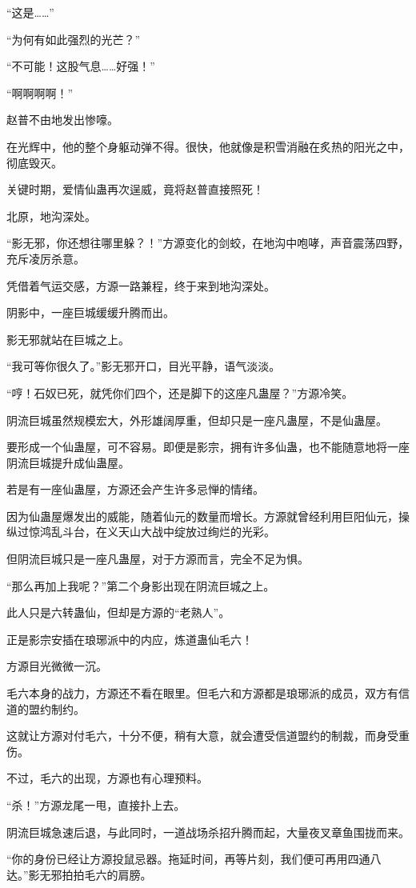\begin{this_body}
“这是……”

“为何有如此强烈的光芒？”

“不可能！这股气息……好强！”

“啊啊啊啊！”

赵普不由地发出惨嚎。

在光辉中，他的整个身躯动弹不得。很快，他就像是积雪消融在炙热的阳光之中，彻底毁灭。

关键时期，爱情仙蛊再次逞威，竟将赵普直接照死！

北原，地沟深处。

“影无邪，你还想往哪里躲？！”方源变化的剑蛟，在地沟中咆哮，声音震荡四野，充斥凌厉杀意。

凭借着气运交感，方源一路兼程，终于来到地沟深处。

阴影中，一座巨城缓缓升腾而出。

影无邪就站在巨城之上。

“我可等你很久了。”影无邪开口，目光平静，语气淡淡。

“哼！石奴已死，就凭你们四个，还是脚下的这座凡蛊屋？”方源冷笑。

阴流巨城虽然规模宏大，外形雄阔厚重，但却只是一座凡蛊屋，不是仙蛊屋。

要形成一个仙蛊屋，可不容易。即便是影宗，拥有许多仙蛊，也不能随意地将一座阴流巨城提升成仙蛊屋。

若是有一座仙蛊屋，方源还会产生许多忌惮的情绪。

因为仙蛊屋爆发出的威能，随着仙元的数量而增长。方源就曾经利用巨阳仙元，操纵过惊鸿乱斗台，在义天山大战中绽放过绚烂的光彩。

但阴流巨城只是一座凡蛊屋，对于方源而言，完全不足为惧。

“那么再加上我呢？”第二个身影出现在阴流巨城之上。

此人只是六转蛊仙，但却是方源的“老熟人”。

正是影宗安插在琅琊派中的内应，炼道蛊仙毛六！

方源目光微微一沉。

毛六本身的战力，方源还不看在眼里。但毛六和方源都是琅琊派的成员，双方有信道的盟约制约。

这就让方源对付毛六，十分不便，稍有大意，就会遭受信道盟约的制裁，而身受重伤。

不过，毛六的出现，方源也有心理预料。

“杀！”方源龙尾一甩，直接扑上去。

阴流巨城急速后退，与此同时，一道战场杀招升腾而起，大量夜叉章鱼围拢而来。

“你的身份已经让方源投鼠忌器。拖延时间，再等片刻，我们便可再用四通八达。”影无邪拍拍毛六的肩膀。


\end{this_body}
